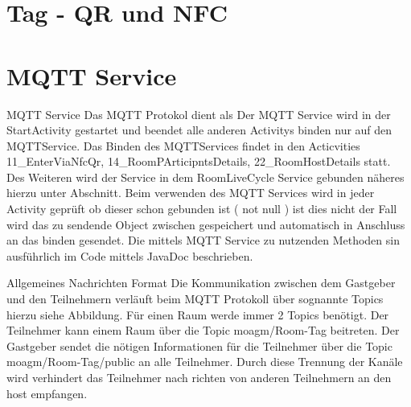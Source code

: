 \section{Tag - QR und NFC}
\label{sec:Tag - QR und NFC}
\section{MQTT Service}
MQTT Service
Das MQTT Protokol dient als 
Der MQTT Service wird in der StartActivity gestartet und beendet alle anderen Activitys binden nur auf den MQTTService. Das Binden des MQTTServices findet in den Acticvities 11\_EnterViaNfcQr, 14\_RoomPArticipntsDetails, 22\_RoomHostDetails statt. Des Weiteren wird der Service in dem RoomLiveCycle Service gebunden näheres hierzu unter Abschnitt.  Beim verwenden des MQTT Services wird in jeder Activity geprüft ob dieser schon gebunden ist ( not null ) ist dies nicht der Fall wird das zu sendende Object zwischen gespeichert und automatisch in Anschluss an das binden gesendet. 
Die mittels MQTT Service zu nutzenden Methoden sin ausführlich im Code mittels JavaDoc beschrieben. 

Allgemeines Nachrichten Format 
Die Kommunikation zwischen dem Gastgeber und den Teilnehmern verläuft beim MQTT Protokoll über sognannte Topics hierzu siehe Abbildung. Für einen Raum werde immer 2 Topics benötigt. Der Teilnehmer kann einem Raum über die Topic moagm/Room-Tag beitreten. Der Gastgeber sendet die nötigen Informationen für die Teilnehmer über die Topic moagm/Room-Tag/public an alle Teilnehmer. Durch diese Trennung der Kanäle wird verhindert das Teilnehmer nach richten von anderen Teilnehmern an den host empfangen.

